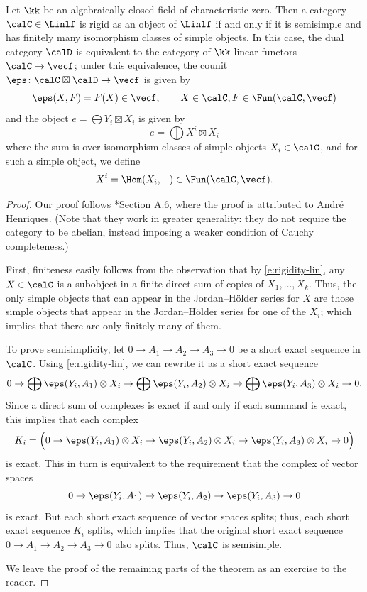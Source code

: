 \begin{theorem}\label{t:dualizable-linear}
  Let $\kk$ be an algebraically closed field of characteristic zero. Then a
  category $\calC\in \Linlf$ is rigid as an object of $\Linlf$ if and only if it
  is semisimple and has finitely many isomorphism classes of simple objects. In
  this case, the dual category $\calD$ is equivalent to the category of
  $\kk$-linear functors $\calC\to \vecf$; under this equivalence, the counit
  $\eps\colon \calC\boxtimes\calD\to \vecf$ is given by
  $$
    \eps(X,F) = F(X)\in \vecf,\qquad X\in \calC, F\in \Fun(\calC, \vecf)
  $$
  and the object $e=\bigoplus Y_i\boxtimes X_i$ is given by
  $$
    e=\bigoplus X^i \boxtimes X_i
  $$
  where the sum is over isomorphism classes of simple objects $X_i\in \calC$,
  and for such a simple object, we define
  $$
    X^i=\Hom(X_i, -)\in \Fun(\calC, \vecf).
  $$
\end{theorem}
\begin{proof}
  Our proof follows *{Section A.6}, where the proof is attributed
  to Andr\'e Henriques. (Note that they work in greater generality: they do not
  require the category to be abelian, instead imposing a weaker condition of
  Cauchy completeness.)


  First, finiteness easily follows from the observation that by
  \eqref{e:rigidity-lin}, any $X\in \calC$ is a subobject in a finite direct sum
  of copies of $X_1, \dots, X_k$. Thus, the only simple objects that can appear
  in the Jordan--H\"older series for $X$ are those simple objects that appear in
  the Jordan--H\"older series for one of the $X_i$; which implies that there are only
  finitely many of them.

  To prove semisimplicity, let $0\to A_1\to A_2\to A_3\to 0$ be a short exact
  sequence in $\calC$. Using \eqref{e:rigidity-lin}, we can rewrite it as a
  short exact sequence
  $$
  0 \to \bigoplus \eps(Y_i, A_1)\otimes X_i
    \to \bigoplus \eps(Y_i, A_2)\otimes X_i
    \to \bigoplus \eps(Y_i, A_3)\otimes X_i
  \to 0.
  $$
  Since a direct sum of complexes is exact if and only if each summand is
  exact, this implies that each complex
  $$
  K_i = \Bigl(
      0 \to  \eps(Y_i, A_1)\otimes X_i
          \to  \eps(Y_i, A_2)\otimes X_i
          \to \eps(Y_i, A_3)\otimes X_i
        \to 0
        \Bigr)
  $$
  is exact. This in turn is equivalent to the requirement that the complex of
  vector spaces
  $$
    0 \to  \eps(Y_i, A_1)
            \to  \eps(Y_i, A_2)
            \to \eps(Y_i, A_3)
    \to 0
  $$
  is exact. But each short exact sequence of vector spaces splits; thus, each
  short exact sequence $K_i$ splits, which implies that the original short
  exact sequence $0\to A_1\to A_2\to A_3\to 0$ also splits. Thus, $\calC$ is
  semisimple.

  We leave the proof of the remaining parts of the theorem as an exercise to the
  reader.
 \end{proof}

